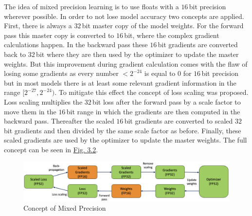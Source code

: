 The idea of mixed precision learning is to use floats with a $16$\,bit precision wherever possible. In order to not lose model accuracy two concepts are applied. First, there is always a $32$\,bit master copy of the model weights. For the forward pass this master copy is converted to $16$\,bit, where the complex gradient calculations happen. In the backward pass these $16$\,bit gradients are converted back to $32$\,bit where they are then used by the optimizer to update the master weights. But this improvement during gradient calculation comes with the flaw of losing some gradients as every number $<2^{-24}$ is equal to $0$ for $16$\,bit precision but in most models there is at least some relevant gradient information in the range $[2^{-27},2^{-24})$. To mitigate this effect the concept of loss scaling was proposed. Loss scaling multiplies the $32$\,bit loss after the forward pass by a scale factor to move them in the $16$\,bit range in which the gradients are then computed in the backward pass. Thereafter the scaled $16$\,bit gradients are converted to scaled $32$\,bit gradients and then divided by the same scale factor as before. Finally, these scaled gradients are used by the optimizer to update the master weights. The full concept can be seen in \hyperref[fig:3.2]{Fig. 3.2}.
%
\begin{figure}[] \label{fig:3.2}
    \centering
    \includegraphics[width=.9\textwidth]{Chapters/figures/mixed_prec.PNG}
    \caption{Concept of Mixed Precision}
\end{figure}
%

